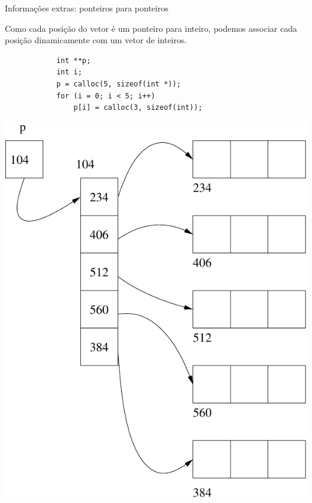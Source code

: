 \documentclass[handout]{beamer}
\begin{document}
\begin{frame}[fragile]{Informações extras: ponteiros para ponteiros}

    Como cada posição do vetor é um ponteiro para inteiro, podemos associar cada posição dinamicamente com um vetor de inteiros.
    \begin{minipage}{0.5\textwidth}
        \begin{verbatim}
            int **p;
            int i;
            p = calloc(5, sizeof(int *));
            for (i = 0; i < 5; i++)
                p[i] = calloc(3, sizeof(int));
        \end{verbatim}
    \end{minipage}
    \begin{minipage}{0.45\textwidth}
        \begin{center}
            \includegraphics[width=\textwidth]{pont5}
        \end{center}
    \end{minipage}

\end{frame}
\end{document}

